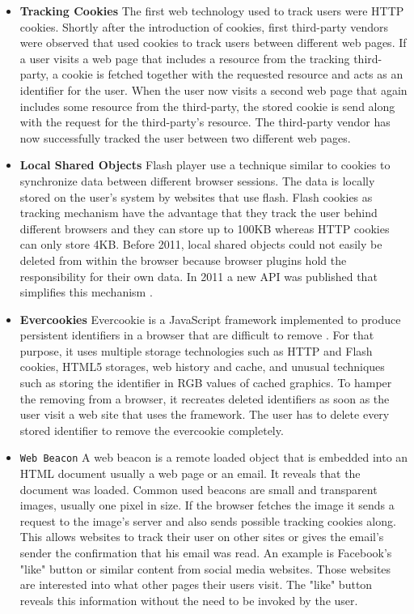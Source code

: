 			\begin{itemize}
				\item \textbf{Tracking Cookies} The first web technology used to track users were HTTP cookies. Shortly after the introduction of cookies, first third-party vendors were observed that used cookies to track users between different web pages. %
				If a user visits a web page that includes a resource from the tracking third-party, a cookie is fetched together with the requested resource and acts as an identifier for the user. When the user now visits a second web page that again includes some resource from the third-party, the stored cookie is send along with the request for the third-party's resource. The third-party vendor has now successfully tracked the user between two different web pages.  
				
				\item \textbf{Local Shared Objects} Flash player use a technique similar to cookies to synchronize data between different browser sessions. The data is locally stored on the user's system by websites that use flash. Flash cookies as tracking mechanism have the advantage that they track the user behind different browsers and they can store up to 100KB whereas HTTP cookies can only store 4KB. Before 2011, local shared objects could not easily be deleted from within the browser because browser plugins hold the responsibility for their own data. In 2011 a new API was published that simplifies this mechanism \cite{mozillaWikiClearPrivacyAPI}.
				
				\item \textbf{Evercookies} Evercookie is a JavaScript framework implemented to produce persistent identifiers in a browser that are difficult to remove \cite{evercookie}. For that purpose, it uses multiple storage technologies such as HTTP and Flash cookies, HTML5 storages, web history and cache, and unusual techniques such as storing the identifier in RGB values of cached graphics. To hamper the removing from a browser, it recreates deleted identifiers as soon as the user visit a web site that uses the framework. The user has to delete every stored identifier to remove the evercookie completely. 
				
				\item \texttt{Web Beacon} A web beacon is a remote loaded object that is embedded into an HTML document usually a web page or an email. It reveals that the document was loaded. Common used beacons are small and transparent images, usually one pixel in size. If the browser fetches the image it sends a request to the image's server and also sends possible tracking cookies along. This allows websites to track their user on other sites or gives the email's sender the confirmation that his email was read. An example is Facebook's "like" button or similar content from social media websites. Those websites are interested into what other pages their users visit. The "like" button reveals this information without the need to be invoked by the user. 
			\end{itemize}
			
